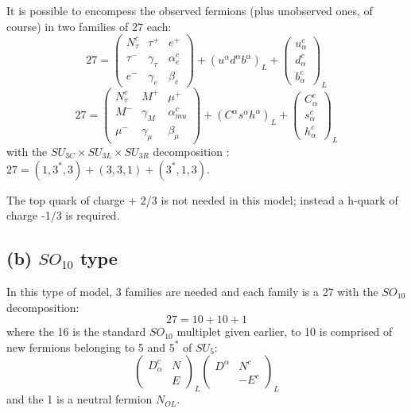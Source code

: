 It is possible to encompess the observed fermions (plus unobserved ones, of course) in two families of 27 each:
\begin{equation*}
27 = 
\begin{pmatrix}
N^{c}_{\tau} & \tau^{+} & e^{+}\\
\tau^{-} & \gamma_{\tau} & \alpha^{c}_{e}\\
e^{-} & \gamma_{e} & \beta_{e}
\end{pmatrix}
 +
 (u^{\alpha} d^{\alpha} b^{\alpha})_{L} + 
 \begin{pmatrix}
 u^{c}_{\alpha} \\
 d^{c}_{\alpha}\\
 b^{c}_{\alpha}
 \end{pmatrix}_{L}
\end{equation*}
\begin{equation*}
27 = 
\begin{pmatrix}
N^{c}_{\tau} & M^{+} & \mu^{+}\\
M^{-} & \gamma_{M} & \alpha^{c}_{mu}\\
\mu^{-} & \gamma_{\mu} & \beta_{\mu}
\end{pmatrix}
 +
 (C^{\alpha} s^{\alpha} h^{\alpha})_{L} + 
 \begin{pmatrix}
 C^{c}_{\alpha} \\
 s^{c}_{\alpha}\\
 h^{c}_{\alpha}
 \end{pmatrix}_{L}
\end{equation*}
with the $SU_{3C} \times SU_{3L} \times SU_{3R}$ decomposition :
$27 = (1, 3^{*}, 3) + (3, 3, 1) + (3^{*}, 1, 3)$.

The top quark of charge + 2/3 is not needed in this model; instead a h-quark of charge -1/3 is required.

\subsection*{(b) $SO_{10}$ type}

In this type of model, 3 families are needed and each family is a 27 with the $SO_{10}$ decomposition:
$$
27 = 10 + 10 + 1
$$
where the 16 is the standard $SO_{10}$ multiplet given earlier, to 10 is comprised of new fermions belonging to 5 and $5^{*}$ of $SU_{5}$:
\begin{equation*}
\begin{pmatrix}
D^{c}_{\alpha}& N \\
  & E
\end{pmatrix}_{L}
\begin{pmatrix}
D^{\alpha}& N^{c} \\
  & -E^{c}
\end{pmatrix}_{L}
\end{equation*}
and the 1 is a neutral fermion $N_{OL}$.

